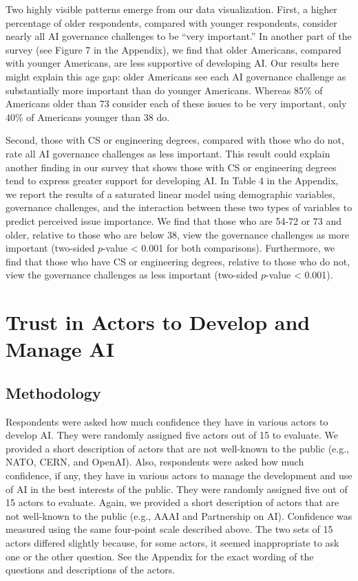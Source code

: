 \documentclass{article}
\begin{document}
Two highly visible patterns emerge from our data visualization. First, a higher percentage of older respondents, compared with younger respondents, consider nearly all AI governance challenges to be ``very important.'' In another part of the survey (see Figure 7 in the Appendix), we find that older Americans, compared with younger Americans, are less supportive of developing AI. Our results here might explain this age gap: older Americans see each AI governance challenge as substantially more important than do younger Americans. Whereas 85\% of Americans older than 73 consider each of these issues to be very important, only 40\% of Americans younger than 38 do.

Second, those with CS or engineering degrees, compared with those who do not, rate all AI governance challenges as less important. This result could explain another finding in our survey that shows those with CS or engineering degrees tend to express greater support for developing AI. In Table 4 in the Appendix, we report the results of a saturated linear model using demographic variables, governance challenges, and the interaction between these two types of variables to predict perceived issue importance. We find that those who are 54-72 or 73 and older, relative to those who are below 38, view the governance challenges as more important (two-sided \(p\)-value \textless{} 0.001 for both comparisons). Furthermore, we find that those who have CS or engineering degrees, relative to those who do not, view the governance challenges as less important (two-sided \(p\)-value \textless{} 0.001).

\section{Trust in Actors to Develop and Manage AI}

\subsection{Methodology}

Respondents were asked how much confidence they have in various actors to develop AI. They were randomly assigned five actors out of 15 to evaluate. We provided a short description of actors that are not well-known to the public (e.g., NATO, CERN, and OpenAI). Also, respondents were asked how much confidence, if any, they have in various actors to manage the development and use of AI in the best interests of the public. They were randomly assigned five out of 15 actors to evaluate. Again, we provided a short description of actors that are not well-known to the public (e.g., AAAI and Partnership on AI). Confidence was measured using the same four-point scale described above. The two sets of 15 actors differed slightly because, for some actors, it seemed inappropriate to ask one or the other question. See the Appendix for the exact wording of the questions and descriptions of the actors.
\end{document}
